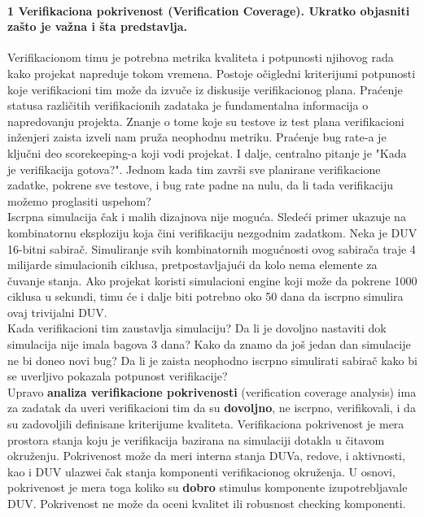 \documentclass[a4paper, 12pt]{article}
\begin{document}
\paragraph{1 Verifikaciona pokrivenost (Verification Coverage). Ukratko objasniti zašto je važna i šta predstavlja.}
\hfill \break
\indent Verifikacionom timu je potrebna metrika kvaliteta i potpunosti njihovog rada kako projekat napreduje tokom vremena. Postoje očigledni kriterijumi potpunosti koje verifikacioni tim može da izvuče iz diskusije verifikacionog plana. Praćenje statusa različitih verifikacionih zadataka je fundamentalna informacija o napredovanju projekta. Znanje o tome koje su testove iz test plana verifikacioni inženjeri zaista izveli nam pruža neophodnu metriku. Praćenje bug rate-a je ključni deo scorekeeping-a koji vodi projekat. I dalje, centralno pitanje je "Kada je verifikacija gotova?". Jednom kada tim završi sve planirane verifikacione zadatke, pokrene sve testove, i bug rate padne na nulu, da li tada verifikaciju možemo proglasiti uspehom?\\
\indent Iscrpna simulacija čak i malih dizajnova nije moguća. Sledeći primer ukazuje na kombinatornu eksploziju koja čini verifikaciju nezgodnim zadatkom. Neka je DUV 16-bitni sabirač. Simuliranje svih kombinatornih mogućnosti ovog sabirača traje 4 milijarde simulacionih ciklusa, pretpostavljajući da kolo nema elemente za čuvanje stanja. Ako projekat koristi simulacioni engine koji može da pokrene 1000 ciklusa u sekundi, timu će i dalje biti potrebno oko 50 dana da iscrpno simulira ovaj trivijalni DUV. \\
\indent Kada verifikacioni tim zaustavlja simulaciju? Da li je dovoljno nastaviti dok simulacija nije imala bagova 3 dana? Kako da znamo da još jedan dan simulacije ne bi doneo novi bug? Da li je zaista neophodno iscrpno simulirati sabirač kako bi se uverljivo pokazala potpunost verifikacije?\\
\indent Upravo \textbf{analiza verifikacione pokrivenosti} (verification coverage analysis) ima za zadatak da uveri verifikacioni tim da su \textbf{dovoljno}, ne iscrpno, verifikovali, i da su zadovoljili definisane kriterijume kvaliteta. Verifikaciona pokrivenost je mera prostora stanja koju je verifikacija bazirana na simulaciji dotakla u čitavom okruženju. Pokrivenost može da meri interna stanja DUVa, redove, i aktivnosti, kao i DUV ulazwei čak stanja komponenti verifikacionog okruženja. U osnovi, pokrivenost je mera toga koliko su \textbf{dobro} stimulus komponente izupotrebljavale DUV. Pokrivenost ne može da oceni kvalitet ili robusnost checking komponenti.
\end{document}
